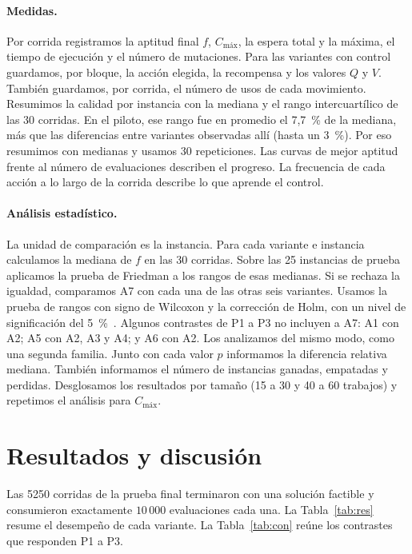 \documentclass[10pt,a4paper]{article}
\newcommand{\Cmax}{C_{\text{máx}}}
\begin{document}
\paragraph{Medidas.}
Por corrida registramos la aptitud final $f$, $\Cmax$, la espera total y la máxima, el tiempo de
ejecución y el número de mutaciones. Para las variantes con control guardamos, por bloque, la
acción elegida, la recompensa y los valores $Q$ y $V$. También guardamos, por corrida, el número
de usos de cada movimiento. Resumimos la calidad por instancia con la mediana y el rango
intercuartílico de las 30 corridas. En el piloto, ese rango fue en promedio el 7,7~\% de la
mediana, más que las diferencias entre variantes observadas allí (hasta un 3~\%). Por eso
resumimos con medianas y usamos 30 repeticiones. Las curvas de mejor aptitud
frente al número de evaluaciones describen el progreso. La frecuencia de cada acción a lo largo
de la corrida describe lo que aprende el control.

\paragraph{Análisis estadístico.}
La unidad de comparación es la instancia. Para cada variante e instancia calculamos la mediana
de $f$ en las 30 corridas. Sobre las 25 instancias de prueba aplicamos la prueba de Friedman a
los rangos de esas medianas. Si se rechaza la igualdad, comparamos A7 con cada una de las otras
seis variantes. Usamos la prueba de rangos con signo de Wilcoxon y la corrección de Holm, con
un nivel de significación del 5~\%~\cite{derrac2011}. Algunos contrastes de P1 a P3 no incluyen
a A7: A1 con A2; A5 con A2, A3 y A4; y A6 con A2. Los analizamos del mismo modo, como una
segunda familia. Junto con cada valor $p$ informamos la diferencia relativa mediana. También
informamos el número de instancias ganadas, empatadas y perdidas. Desglosamos los resultados
por tamaño (15 a 30 y 40 a 60 trabajos) y repetimos el análisis para $\Cmax$.

\section{Resultados y discusión}
\label{sec:res}

Las 5250 corridas de la prueba final terminaron con una solución factible y consumieron
exactamente $10\,000$ evaluaciones cada una. La Tabla~\ref{tab:res} resume el desempeño de cada
variante. La Tabla~\ref{tab:con} reúne los contrastes que responden P1 a P3.
\end{document}
